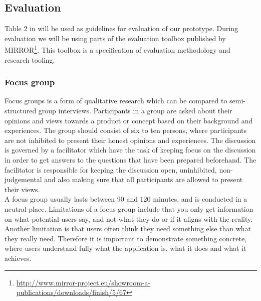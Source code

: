 \subsection{Evaluation}
Table 2 in \cite{Esearch2004} will be used as guidelines for evaluation of our prototype. 
During evaluation we will be using parts of the evaluation toolbox published by MIRROR\footnote{\url{http://www.mirror-project.eu/showroom-a-publications/downloads/finish/5/67}}. This toolbox is a specification of evaluation methodology and research tooling. 

\subsubsection{Focus group}
Focus groups is a form of qualitative research which can be compared to semi-structured group interviews\cite{rogers2011interaction}. Participants in a group are asked about their opinions and views towards a product or concept based on their background and experiences\cite{krueger2008focus}. The group should consist of six to ten persons, where participants are not inhibited to present their honest opinions and experiences\cite{krueger2008focus}. The discussion is governed by a facilitator which have the task of keeping focus on the discussion in order to get answers to the questions that have been prepared beforehand\cite{krueger2008focus, nielsen1997use}. The facilitator is responsible for keeping the discussion open, uninhibited, non-judgemental and also making sure that all participants are allowed to present their views\cite{powell1996focus}. \\
A focus group usually lasts between 90 and 120 minutes, and is conducted in a neutral place. Limitations of a focus group include that you only get information on what potential users say, and not what they do or if it aligns with the reality\cite{nielsen1997use}. Another limitation is that users often think they need something else than what they really need. Therefore it is important to demonstrate something concrete, where users understand fully what the application is, what it does and what it achieves. 
 
